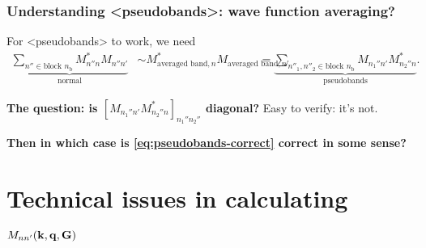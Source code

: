 \documentclass[t,aspectratio=169]{beamer}
\newcommand{\shortcode}[1]{\texttt{#1}}
\def\\{}%
\def\texttt#1{<#1>}%
\begin{document}
\begin{frame}
\begin{columns}
\end{columns}


\end{frame}


\begin{frame}
\frametitle{Understanding \shortcode{pseudobands}: wave function averaging?}

For \shortcode{pseudobands} to work, we need 
\begin{equation}
    \begin{aligned}
        \underbrace{
            \sum_{n'' \in \text{block $n_{\text{b}}$}} M_{n'' n}^* M_{n'' n'} 
        }_{\text{normal}}
        &\sim M_{\text{averaged band}, n}^* M_{\text{averaged band}, n'} \\
        &= \underbrace{
            \sum_{n''_1, n''_2 \in \text{block $n_{\text{b}}$}} M_{n_1'' n'} M_{n_2'' n}^*
        }_{\text{pseudobands}}.
    \end{aligned}
    \label{eq:pseudobands-correct}
\end{equation}

\textbf{The question: is $[M_{n_1'' n'} M_{n_2'' n}^*]_{n_1'' n_2''}$ diagonal?}
Easy to verify: it's not.

\vspace{0.5cm}

\textbf{Then in which case is \eqref{eq:pseudobands-correct} correct in some sense?} 

\end{frame}

\section{Technical issues in calculating $M_{nn'}(\vb{k}, \vb{q}, \vb{G})$}
\end{document}
